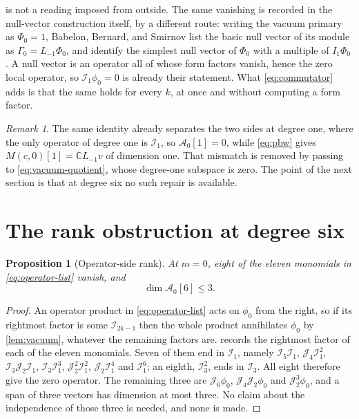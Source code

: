 \documentclass[11pt,reqno]{amsart}
\theoremstyle{plain}
\newtheorem{proposition}[theorem]{Proposition}
\theoremstyle{definition}
\theoremstyle{remark}
\newtheorem{remark}[theorem]{Remark}
\numberwithin{equation}{section}
\newcommand{\Aop}{\mathcal A}
\newcommand{\Iop}{\mathcal I}
\newcommand{\Jop}{\mathcal J}
\newcommand{\C}{\mathbb C}
\begin{document}
 is not a reading imposed from outside. The same vanishing is
recorded in the null-vector construction itself, by a different route: writing
the vacuum primary as $\Phi_0=1$, Babelon, Bernard, and Smirnov list the basic
null vector of its module as $\Gamma_0=L_{-1}\Phi_0$, and identify the simplest
null vector of $\Phi_0$ with a multiple of $I_1\Phi_0$ \cite{Babelon_1997nv}. A
null vector is an operator all of whose form factors vanish, hence the zero
local operator, so $\Iop_1\phi_0=0$ is already their statement. What
\eqref{eq:commutator} adds is that the same holds for every $k$, at once and
without computing a form factor.

\begin{remark}
\label{rem:degree-one}
The same identity already separates the two sides at degree one, where the
only operator of degree one is $\Iop_1$, so $\Aop_0[1]=0$, while
\eqref{eq:pbw} gives $M(c,0)[1]=\C L_{-1}v$ of dimension one. That mismatch
is removed by passing to \eqref{eq:vacuum-quotient}, whose degree-one
subspace is zero. The point of the next section is that at degree six no such
repair is available.
\end{remark}

\section{The rank obstruction at degree six}
\label{sec:rank}

\begin{proposition}[Operator-side rank]
\label{prop:rank}
At $m=0$, eight of the eleven monomials in \eqref{eq:operator-list} vanish,
and
\begin{equation}
  \dim\Aop_0[6]\le3.
  \label{eq:rank-three}
\end{equation}
\end{proposition}

\begin{proof}
An operator product in \eqref{eq:operator-list} acts on $\phi_0$ from the
right, so if its rightmost factor is some $\Iop_{2k-1}$ then the whole
product annihilates $\phi_0$ by \cref{lem:vacuum}, whatever the remaining
factors are.  records the rightmost factor of each
of the eleven monomials. Seven of them end in $\Iop_1$, namely
$\Iop_5\Iop_1$, $\Jop_4\Iop_1^2$, $\Iop_3\Jop_2\Iop_1$, $\Iop_3\Iop_1^3$,
$\Jop_2^2\Iop_1^2$, $\Jop_2\Iop_1^4$ and $\Iop_1^6$; an eighth, $\Iop_3^2$,
ends in $\Iop_3$. All eight therefore give the zero operator. The remaining
three are $\Jop_6\phi_0$, $\Jop_4\Jop_2\phi_0$ and $\Jop_2^3\phi_0$, and a
span of three vectors has dimension at most three. No claim about the
independence of those three is needed, and none is made.
\end{proof}
\end{document}

